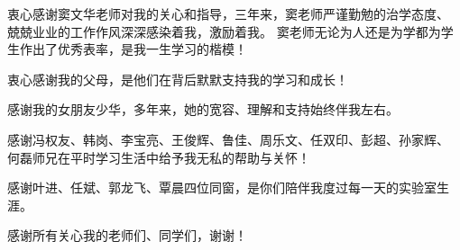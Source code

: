 

\begin{ack}
  衷心感谢窦文华老师对我的关心和指导，三年来，窦老师严谨勤勉的治学态度、
  兢兢业业的工作作风深深感染着我，激励着我。
  窦老师无论为人还是为学都为学生作出了优秀表率，是我一生学习的楷模！

  衷心感谢我的父母，是他们在背后默默支持我的学习和成长！

  感谢我的女朋友少华，多年来，她的宽容、理解和支持始终伴我左右。

  感谢冯权友、韩岗、李宝亮、王俊辉、鲁佳、周乐文、任双印、彭超、孙家辉、
  何磊师兄在平时学习生活中给予我无私的帮助与关怀！

  感谢叶进、任斌、郭龙飞、覃晨四位同窗，是你们陪伴我度过每一天的实验室生涯。

  感谢所有关心我的老师们、同学们，谢谢！
\end{ack}
